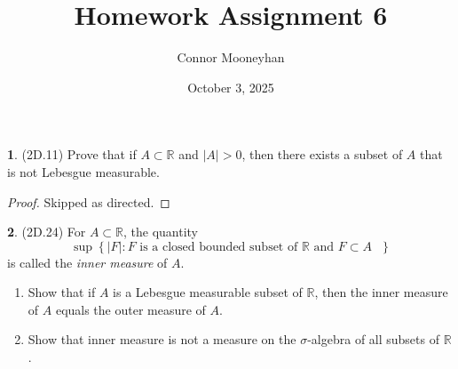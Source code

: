 \documentclass[12pt]{article}
\title{Homework Assignment 6}
\author{Connor Mooneyhan}
\date{October 3, 2025}
\theoremstyle{definition}
\newtheorem{ex}{}
\begin{document}
\maketitle

\begin{ex}
	(2D.11)
	Prove that if $A \subset \mathbb{R}$ and $|A| > 0$, then there exists a subset of $A$ that is not Lebesgue measurable.
\end{ex}
\begin{proof}
	Skipped as directed.
\end{proof}

\begin{ex}
	(2D.24)
	For $A \subset \mathbb{R}$, the quantity \begin{equation*}
		\sup \left\lbrace |F| : F \text{ is a closed bounded subset of $\mathbb{R}$ and $F \subset A$ } \right\rbrace
	\end{equation*}
	is called the \textit{inner measure} of $A$.
	\begin{enumerate}[label=(\alph*)]
		\item Show that if $A$ is a Lebesgue measurable subset of $\mathbb{R}$, then the inner measure of $A$ equals the outer measure of $A$.
		\item Show that inner measure is not a measure on the $\sigma$-algebra of all subsets of $\mathbb{R}$.
	\end{enumerate}
\end{ex}
\end{document}
